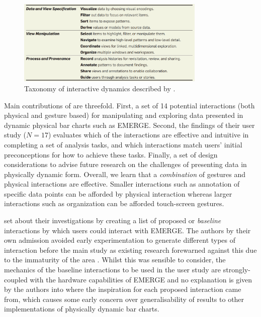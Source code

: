\documentclass[11pt]{article}
\begin{document}
\begin{figure}[H]
\centering
\includegraphics[width=0.8\textwidth]{img/heer2012-taxonomy.png} 
\caption{Taxonomy of interactive dynamics described by \protect\citet{heer2012}.}\label{fig:heer2012-taxonomy}
\end{figure}

Main contributions of \citet{taher2015} are threefold. First, a set of 14 potential interactions (both physical and gesture based) for manipulating and exploring data presented in dynamic physical bar charts such as EMERGE. Second, the findings of their user study ($N=17$) evaluates which of the interactions are effective and intuitive in completing a set of analysis tasks, and which interactions match users' initial preconceptions for how to achieve these tasks. Finally, a set of design considerations to advise future research on the challenges of presenting data in physically dynamic form. Overall, we learn that a \textit{combination} of gestures and physical interactions are effective. Smaller interactions such as annotation of specific data points can be afforded by physical interaction whereas larger interactions such as organization can be afforded touch-screen gestures. 

\citeauthor{taher2015} set about their investigations by creating a list of proposed or \textit{baseline} interactions by which users could interact with EMERGE. The authors by their own admission avoided early experimentation to generate different types of interaction before the main study as existing research forewarned against this due to the immaturity of the area \citep{hornbaek2013}. Whilst this was sensible to consider, the mechanics of the baseline interactions to be used in the user study are strongly-coupled with the hardware capabilities of EMERGE and no explanation is given by the authors into where the inspiration for each proposed interaction came from, which causes some early concern over generalisability of results to other implementations of physically dynamic bar charts.
\end{document}
